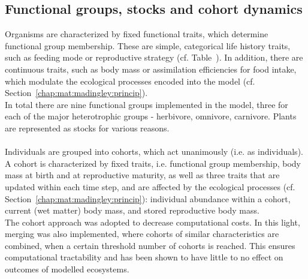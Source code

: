 \subsection{Functional groups, stocks and cohort dynamics}
\label{chap:mat:madingley:func}
%
Organisms are characterized by fixed functional traits, which determine functional group membership. These are simple, categorical life history traits, such as feeding mode or reproductive strategy (cf. Table~). In addition, there are continuous traits, such as body mass or assimilation efficiencies for food intake, which modulate the ecological processes encoded into the model (cf. Section~\ref{chap:mat:madingley:princip}).\\
In total there are nine functional groups implemented in the model, three for each of the major heterotrophic groups - herbivore, omnivore, carnivore. Plants are represented as stocks for various reasons.\\\\
 Individuals are grouped into cohorts, which act unanimously (i.e. as individuals).  A cohort is characterized by fixed traits, i.e. functional group membership, body mass at birth and at reproductive maturity, as well as three traits that are updated within each time step, and are affected by the ecological processes (cf. Section~\ref{chap:mat:madingley:princip}): individual abundance within a cohort, current (wet matter) body mass, and stored reproductive body mass. \\
 The cohort approach was adopted to decrease computational costs. In this light, merging was also implemented, where cohorts of similar characteristics are combined, when a certain threshold number of cohorts is reached. This ensures computational tractability and has been shown to have little to no effect on outcomes of modelled ecosystems.
